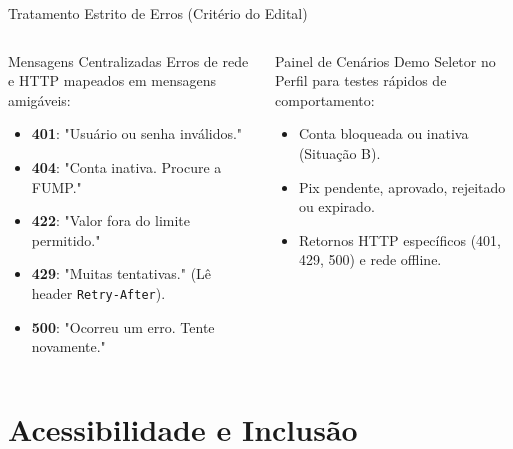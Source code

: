 \documentclass[10pt, aspectratio=169]{beamer}
\begin{document}
\begin{frame}{Tratamento Estrito de Erros (Critério do Edital)}
  \begin{columns}[T,onlytextwidth]
      \begin{block}{Mensagens Centralizadas}
        \small
        Erros de rede e HTTP mapeados em mensagens amigáveis:
        \begin{itemize}
          \item \textbf{401}: "Usuário ou senha inválidos."
          \item \textbf{404}: "Conta inativa. Procure a FUMP."
          \item \textbf{422}: "Valor fora do limite permitido."
          \item \textbf{429}: "Muitas tentativas." (Lê header \texttt{Retry-After}).
          \item \textbf{500}: "Ocorreu um erro. Tente novamente."
        \end{itemize}
      \end{block}

      \begin{exampleblock}{Painel de Cenários Demo}
        \small
        Seletor no Perfil para testes rápidos de comportamento:
        \begin{itemize}
          \item Conta bloqueada ou inativa (Situação B).
          \item Pix pendente, aprovado, rejeitado ou expirado.
          \item Retornos HTTP específicos (401, 429, 500) e rede offline.
        \end{itemize}
      \end{exampleblock}
  \end{columns}
\end{frame}

\section{Acessibilidade e Inclusão}
\end{document}
